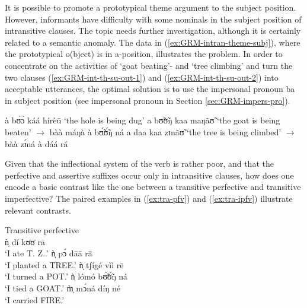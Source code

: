 \begin{exe}
\begin{exe}
\begin{exe}
{\begin{exe}
\begin{exe}
\begin{exe}
\begin{exe}
\begin{exe}
\begin{exe}
\begin{exe}
\begin{exe}
\begin{exe}
\begin{exe}
\begin{exe}
\begin{exe}
\begin{exe}
\begin{exe}
\begin{exe}
\begin{exe}
\begin{exe}
\begin{exe}
\begin{exe}
It is possible to promote a prototypical theme argument to the subject position.
However,  informants have difficulty with some nominals in the subject
position of
intransitive clauses.   The topic needs further investigation, although it is
certainly related to a semantic anomaly.  The data in
(\ref{ex:GRM-intran-theme-subj}), where the  prototypical {\sc o}(bject) is in
 {\sc a}-position, illustrates the problem. In order to concentrate on the 
 activities of  `goat
beating'- and `tree climbing'  and turn the two clauses
(\ref{ex:GRM-int-th-su-out-1}) and (\ref{ex:GRM-int-th-su-out-2}) into
acceptable utterances,  the optimal solution is to use the
impersonal pronoun {\sls ba} in subject position  (see impersonal
pronoun in
Section \ref{sec:GRM-impers-pro}).



\ea\label{ex:GRM-intran-theme-subj}

\ea
à bʊ̀ɔ̀ káá hírèū  {\rm `the hole is being dug'}
\ex\label{ex:GRM-int-th-su-out-1}
\textasteriskcentered a bʊ̃ʊ̃ŋ   kaa maŋãʊ̃  {\rm  `the goat is being beaten' }
$\rightarrow$ {\sls 
bàà máŋà à bʊ̃́ʊ̃́ŋ ná}
\ex\label{ex:GRM-int-th-su-out-2}
\textasteriskcentered a daa kaa zɪnãʊ̃  {\rm   `the tree is being climbed'}   
$\rightarrow$ {\sls 
bàà zɪ́ná à dáá rá}


\z 
 \z


Given that  the inflectional system of the verb is rather poor, and that the 
perfective
and assertive suffixes occur only in intransitive clauses,  how does one
encode a basic contrast like the one between a transitive perfective and
transitive imperfective? The paired examples in (\ref{ex:tra-pfv}) and
(\ref{ex:tra-ipfv})  illustrate 
 relevant contrasts.\nolinebreak 
 


\begin{multicols}{2}
\ea\label{ex:tra-pfv}{\rm Transitive perfective}\\

  \ea\label{ex:tra-pfv-eat}
ǹ̩ dí kʊ̄ʊ̄ rā\\
 `I ate T. Z..' 
 \ex\label{ex:tra-pfv-plant}
ǹ̩ pɔ́ dāā rā\\
`I planted a TREE.'
 \ex\label{ex:tra-pfv-cover}
ǹ̩ tʃígé vìì rē\\
`I turned a POT.' 
 \ex\label{ex:tra-pfv-tie}
ǹ̩ lómó bʊ̃́ʊ̃́ŋ ná\\
`I tied a GOAT.' 
 \ex\label{ex:tra-pfv-carry}
m̩̀ mɔ́ná díŋ né\\
`I carried  FIRE.' 


\end{multicols}
\end{exe}
\end{exe}
\end{exe}
\end{exe}
\end{exe}
\end{exe}
\end{exe}
\end{exe}
\end{exe}
\end{exe}
\end{exe}
\end{exe}
\end{exe}
\end{exe}
\end{exe}
\end{exe}
\end{exe}
\end{exe}
\end{exe}}
\end{exe}
\end{exe}
\end{exe}

